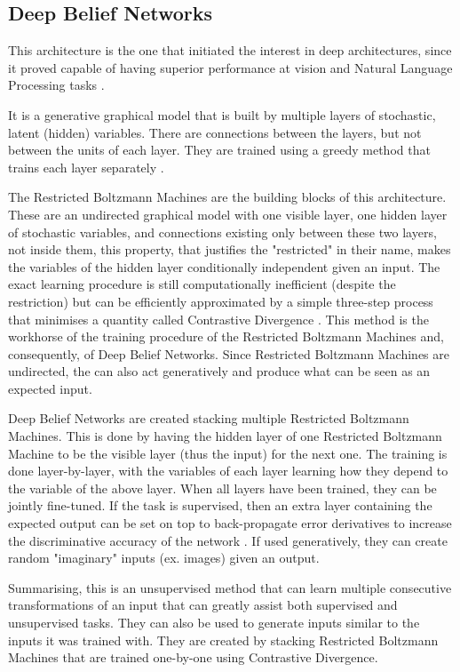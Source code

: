 \documentclass[a4paper]{article}
\begin{document}
		\subsection{Deep Belief Networks}
		\label{sec:DBN}		
			This architecture is the one that initiated the interest in deep architectures, since it proved capable of having superior performance at vision and Natural Language Processing tasks \cite{Hinton2006,Hinton2006a}. 

			It is a generative graphical model that is built by multiple layers of stochastic, latent (hidden) variables. There are connections between the layers, but not between the units of each layer. They are trained using a greedy method that trains each layer separately \cite{Hinton2006a}. 
			
			The Restricted Boltzmann Machines are the building blocks of this architecture. These are an undirected graphical model with one visible layer, one hidden layer of stochastic variables, and connections existing only between these two layers, not inside them, this property, that justifies the "restricted" in their name, makes the variables of the hidden layer conditionally independent given an input. The exact learning procedure is still computationally inefficient (despite the restriction) but can be efficiently approximated by a simple three-step process that minimises a quantity called Contrastive Divergence \cite{Hinton2002}. This method is the workhorse of the training procedure of the Restricted Boltzmann Machines and, consequently, of Deep Belief Networks. Since Restricted Boltzmann Machines are undirected, the can also act generatively and produce what can be seen as an expected input.
			
			Deep Belief Networks are created stacking multiple Restricted Boltzmann Machines. This is done by having the hidden layer of one Restricted Boltzmann Machine to be the visible layer (thus the input) for the next one. The training is done layer-by-layer,  with the variables of each layer learning how they depend to the variable of the above layer. When all layers have been trained, they can be jointly fine-tuned. If the task is supervised, then an extra layer containing the expected output can be set on top to back-propagate error derivatives to increase the discriminative accuracy of the network \cite{Hinton2006}. If used generatively, they can create random "imaginary" inputs (ex. images) given an output.
				
			Summarising, this is an unsupervised method that can learn multiple consecutive transformations of an input that can greatly assist both supervised and unsupervised tasks. They can also be used to generate inputs similar to the inputs it was trained with. They are created by stacking Restricted Boltzmann Machines that are trained one-by-one using Contrastive Divergence.
			
\end{document}
